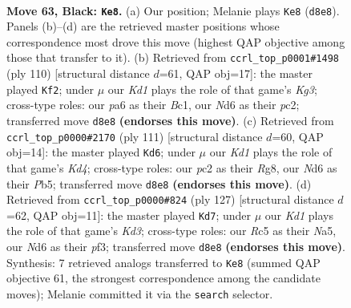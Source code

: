 \documentclass[11pt]{article}
\begin{document}
\clearpage

\begin{figure}[p]\centering
\begin{subfigure}{0.46\textwidth}\centering
\resizebox{\linewidth}{!}{%
\newchessgame
\chessboard[
  setfen={3k3r/R6p/P2n4/2r5/R7/1Pp3KP/2P3P1/5B2 b - - 4 63},
  showmover=false,
  pgfstyle=straightmove, color=movearrow, markmove={d8-e8}
]}
\caption{}
\end{subfigure}\hfill
\begin{subfigure}{0.46\textwidth}\centering
\resizebox{\linewidth}{!}{%
\newchessgame
\chessboard[
  setfen={1kr5/1p3p2/p3p3/4P3/7R/3b2K1/2p5/R1B5 w - - 2 56},
  showmover=false,
  pgfstyle=straightmove, color=movearrow, markmove={g3-f2}
]}
\caption{}
\end{subfigure}
\\[4pt]
\begin{subfigure}{0.46\textwidth}\centering
\resizebox{\linewidth}{!}{%
\newchessgame
\chessboard[
  setfen={6r1/2R1P1p1/p7/1p1k3r/8/P1B5/KPP5/8 b - - 1 56},
  showmover=false,
  pgfstyle=straightmove, color=movearrow, markmove={d5-d6}
]}
\caption{}
\end{subfigure}\hfill
\begin{subfigure}{0.46\textwidth}\centering
\resizebox{\linewidth}{!}{%
\newchessgame
\chessboard[
  setfen={7R/8/1p1k4/nP6/2pr4/5P1P/6P1/5BK1 b - - 4 64},
  showmover=false,
  pgfstyle=straightmove, color=movearrow, markmove={d6-d7}
]}
\caption{}
\end{subfigure}
\caption{\textbf{Move 63, Black: \texttt{Ke8}.} (a) Our position; Melanie plays \texttt{Ke8} (\texttt{d8e8}). Panels (b)--(d) are the retrieved master positions whose correspondence most drove this move (highest QAP objective among those that transfer to it). (b) Retrieved from \texttt{ccrl\_top\_p0001\#1498} (ply 110) [structural distance $d$=61, QAP obj=17]: the master played \texttt{Kf2}; under $\mu$ our \emph{Kd1} plays the role of that game's \emph{Kg3}; cross-type roles: our \emph{p}a6 as their \emph{B}c1, our \emph{N}d6 as their \emph{p}c2; transferred move \texttt{d8e8} \textbf{(endorses this move)}. (c) Retrieved from \texttt{ccrl\_top\_p0000\#2170} (ply 111) [structural distance $d$=60, QAP obj=14]: the master played \texttt{Kd6}; under $\mu$ our \emph{Kd1} plays the role of that game's \emph{Kd4}; cross-type roles: our \emph{p}c2 as their \emph{R}g8, our \emph{N}d6 as their \emph{P}b5; transferred move \texttt{d8e8} \textbf{(endorses this move)}. (d) Retrieved from \texttt{ccrl\_top\_p0000\#824} (ply 127) [structural distance $d$=62, QAP obj=11]: the master played \texttt{Kd7}; under $\mu$ our \emph{Kd1} plays the role of that game's \emph{Kd3}; cross-type roles: our \emph{R}c5 as their \emph{N}a5, our \emph{N}d6 as their \emph{p}f3; transferred move \texttt{d8e8} \textbf{(endorses this move)}. Synthesis: 7 retrieved analogs transferred to \texttt{Ke8} (summed QAP objective 61, the strongest correspondence among the candidate moves); Melanie committed it via the \texttt{search} selector.}
\label{fig:thought-m125}
\end{figure}
\end{document}
